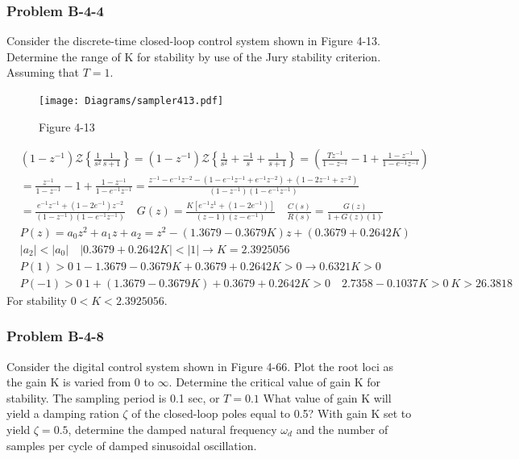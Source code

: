 \subsubsection*{Problem B-4-4}
Consider the discrete-time closed-loop control system shown in Figure 4-13. Determine
the range of K for stability by use of the Jury stability criterion. Assuming that $T=1$.

\begin{figure}[H]
	\centering
	\texttt{[image: Diagrams/sampler413.pdf]}
	\caption*{Figure 4-13}
	\label{fig:samplerblock413}
\end{figure}

\begin{align*}
&(1-z^{-1}) \mathcal{Z} \left\{ \frac{1}{s^2}\frac{1}{s+1} \right\}= (1-z^{-1}) \mathcal{Z} \left\{ \frac{1}{s^2}+\frac{-1}{s}+\frac{1}{s+1} \right\} =  \left(\frac{Tz^{-1}}{1-z^{-1}}-1+\frac{1-z^{-1}}{1-e^{-1}z^{-1}}\right) \\
& = \frac{z^{-1}}{1-z^{-1}}-1+\frac{1-z^{-1}}{1-e^{-1}z^{-1}} =\frac{z^{-1}-e^{-1}z^{-2}
	-(1-e^{-1}z^{-1}+e^{-1}z^{-2}) +(1-2z^{-1}+z^{-2}
	)}{(1-z^{-1})(1-e^{-1}z^{-1})} \\
& = \frac{e^{-1}z^{-1}+(1-2e^{-1})z^{-2}}{(1-z^{-1})(1-e^{-1}z^{-1})} \quad G(z) = \frac{K[e^{-1}z^{1}+(1-2e^{-1})]}{(z-1)(z-e^{-1})} \quad \frac{C(s)}{R(s)}=\frac{G(z)}{1+G(z)(1)} \\
& P(z)= a_0z^2+a_1z+a_2=z^2-(1.3679-0.3679K)z+(0.3679+0.2642K) \\
& |a_2| < |a_0| \quad |0.3679+0.2642K| < |1| \rightarrow K =2.3925056 \\
& P(1) > 0 \ 1-1.3679-0.3679K + 0.3679+0.2642K > 0 \rightarrow 0.6321K > 0 \\
& P(-1) > 0 \ 1+(1.3679-0.3679K)+0.3679+0.2642K > 0 \quad 2.7358-0.1037K > 0 \ K > 26.3818
\end{align*}
For stability $0 < K < 2.3925056$.

\subsubsection*{Problem B-4-8}
Consider the digital control system shown in Figure 4-66. Plot the root loci as the gain K is varied from $0$ to $\infty$. Determine the critical value of gain K for stability. The sampling period is 0.1 sec, or $T=0.1$ What value of gain K will yield a damping ration $\zeta$ of the closed-loop poles equal to 0.5? With gain K set to yield $\zeta=0.5$, determine the damped natural frequency $\omega_d$ and the number of samples per cycle of damped sinusoidal oscillation.

